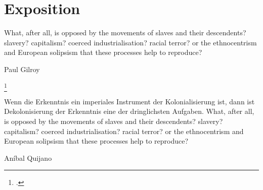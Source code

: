 \section{Exposition}
\epigraph{
    What, after all, is opposed by the movements of slaves and their descendents?
slavery? capitalism? coerced industrialisation? racial terror?
or the ethnocentrism and European solipsism that these processes help to reproduce?
    }{Paul Gilroy\footnotemark} \footcitetext{gilroyatlantic}

\epigraph{ Wenn die Erkenntnis ein imperiales Instrument der Kolonialisierung
ist, dann ist Dekolonisierung der Erkenntnis eine der dringlichsten Aufgaben.
What, after all, is opposed by the movements of slaves and their descendents?
slavery? capitalism? coerced industrialisation? racial terror?  or the
ethnocentrism and European solipsism that these processes help to reproduce?
}{Aníbal Quijano\footnotemark}


